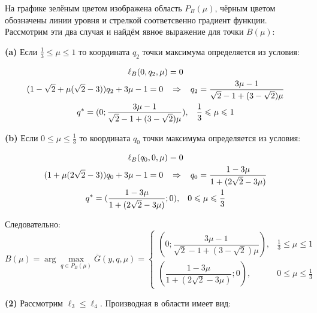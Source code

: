 \begin{flushleft}
	На графике зелёным цветом изображена область $P_B(\mu)$, чёрным цветом
	обозначены линии уровня и стрелкой соответсвенно градиент функции.
	Рассмотрим эти два случая и найдём явное выражение для точки $B(\mu)$:
	
	\textbf{(a)} Если $\frac{1}{3} \leqslant \mu \leqslant 1$ то координата $q_2$ точки 
	максимума определяется из условия: 
	
	\begin{gather*}
		\ell_B(0,q_2,\mu)=0
		\\
		(1-\sqrt{2}+\mu(\sqrt{2}-3))q_2+3\mu-1=0
		\hspace{3mm} \Rightarrow \hspace{3mm}
		q_2=\frac{3\mu-1}{\sqrt{2}-1+(3-\sqrt{2})\mu}	
		\\
		q^*=(0;\dfrac{3\mu-1}{\sqrt{2}-1+(3-\sqrt{2})\mu}), \hspace{3mm}
		\frac{1}{3} \leqslant \mu \leqslant 1
	\end{gather*}

	\textbf{(b)} Если $0 \leqslant \mu \leqslant \frac{1}{3}$ то координата $q_0$ точки 
	максимума определяется из условия: 	

	\begin{gather*}
		\ell_B(q_0,0,\mu)=0
		\\	
		(1+\mu(2\sqrt{2}-3))q_0
		+3\mu-1=0
		\hspace{3mm} \Rightarrow \hspace{3mm}
		q_0=\frac{1-3\mu}{1+(2\sqrt{2}-3\mu)}	
		\\ 	
		q^*=(\frac{1-3\mu}{1+(2\sqrt{2}-3\mu)}; 0), \hspace{3mm}
		0 \leqslant \mu \leqslant \frac{1}{3}
	\end{gather*}
	
	Следовательно:
	\begin{equation} \label{eq:B}
		B(\mu) = \arg \max \limits_{q\in P_B(\mu)} \overline G(y,q,\mu) = 
		\begin{cases}
			(0;\dfrac{3\mu-1}{\sqrt{2}-1+(3-\sqrt{2})\mu})
			, & \frac{1}{3} \leqslant \mu \leqslant 1
			\\
			(\dfrac{1-3\mu}{1+(2\sqrt{2}-3\mu)};0)
			, & 0 \leqslant \mu \leqslant \frac{1}{3}
		\end{cases}
	\end{equation}


	\textbf{(2)} Рассмотрим $\ell_3 \leqslant \ell_4$.
	Производная в области имеет вид:
	

\end{flushleft}
